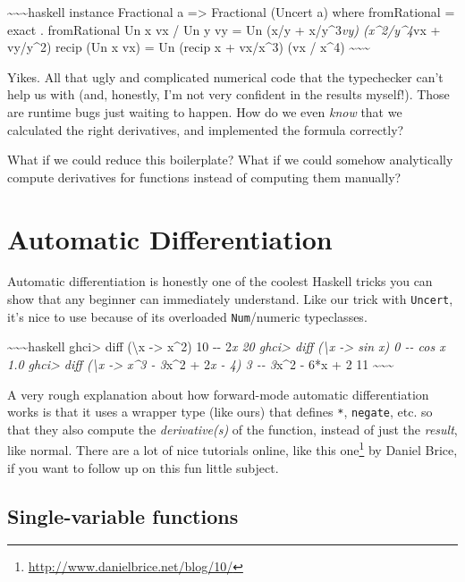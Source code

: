 \documentclass[]{article}
\renewcommand{\href}[2]{#2\footnote{\url{#1}}}
\begin{document}
\textasciitilde{}\textasciitilde{}\textasciitilde{}haskell instance Fractional a
=\textgreater{} Fractional (Uncert a) where fromRational = exact . fromRational
Un x vx / Un y vy = Un (x/y + x/y\^{}3\emph{vy) (x\^{}2/y\^{}4}vx + vy/y\^{}2)
recip (Un x vx) = Un (recip x + vx/x\^{}3) (vx / x\^{}4)
\textasciitilde{}\textasciitilde{}\textasciitilde{}

Yikes. All that ugly and complicated numerical code that the typechecker can't
help us with (and, honestly, I'm not very confident in the results myself!).
Those are runtime bugs just waiting to happen. How do we even \emph{know} that
we calculated the right derivatives, and implemented the formula correctly?

What if we could reduce this boilerplate? What if we could somehow analytically
compute derivatives for functions instead of computing them manually?

\section{Automatic Differentiation}

Automatic differentiation is honestly one of the coolest Haskell tricks you can
show that any beginner can immediately understand. Like our trick with
\texttt{Uncert}, it's nice to use because of its overloaded \texttt{Num}/numeric
typeclasses.

\textasciitilde{}\textasciitilde{}\textasciitilde{}haskell ghci\textgreater{}
diff (\textbackslash{}x -\textgreater{} x\^{}2) 10 -\/- 2\emph{x 20
ghci\textgreater{} diff (\textbackslash{}x -\textgreater{} sin x) 0 -\/- cos x
1.0 ghci\textgreater{} diff (\textbackslash{}x -\textgreater{} x\^{}3 - 3}x\^{}2
+ 2\emph{x - 4) 3 -\/- 3}x\^{}2 - 6*x + 2 11
\textasciitilde{}\textasciitilde{}\textasciitilde{}

A very rough explanation about how forward-mode automatic differentiation works
is that it uses a wrapper type (like ours) that defines \texttt{*},
\texttt{negate}, etc. so that they also compute the \emph{derivative(s)} of the
function, instead of just the \emph{result}, like normal. There are a lot of
nice tutorials online, like \href{http://www.danielbrice.net/blog/10/}{this one}
by Daniel Brice, if you want to follow up on this fun little subject.

\subsection{Single-variable functions}
\end{document}
